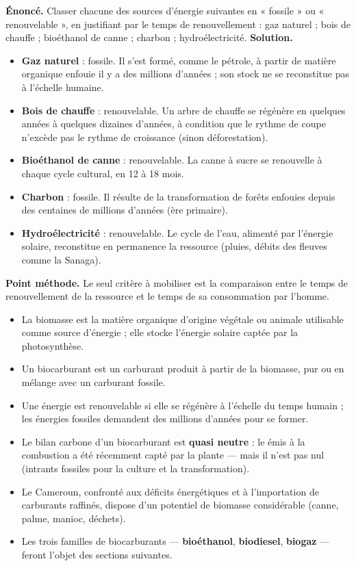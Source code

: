 \documentclass[11pt]{article}
\newcommand{\cle}[1]{{\popxbold\color{popdark}#1}}
\begin{document}
\begin{exoresolu}
\textbf{Énoncé.} Classer chacune des sources d'énergie suivantes en « fossile » ou « renouvelable », en justifiant par le temps de renouvellement : gaz naturel ; bois de chauffe ; bioéthanol de canne ; charbon ; hydroélectricité.
\tcblower
\textbf{Solution.}
\begin{itemize}
\item \textbf{Gaz naturel} : fossile. Il s'est formé, comme le pétrole, à partir de matière organique enfouie il y a des millions d'années ; son stock ne se reconstitue pas à l'échelle humaine.
\item \textbf{Bois de chauffe} : renouvelable. Un arbre de chauffe se régénère en quelques années à quelques dizaines d'années, à condition que le rythme de coupe n'excède pas le rythme de croissance (sinon déforestation).
\item \textbf{Bioéthanol de canne} : renouvelable. La canne à sucre se renouvelle à chaque cycle cultural, en 12 à 18 mois.
\item \textbf{Charbon} : fossile. Il résulte de la transformation de forêts enfouies depuis des centaines de millions d'années (ère primaire).
\item \textbf{Hydroélectricité} : renouvelable. Le cycle de l'eau, alimenté par l'énergie solaire, reconstitue en permanence la ressource (pluies, débits des fleuves comme la Sanaga).
\end{itemize}
\textbf{Point méthode.} Le seul critère à mobiliser est la comparaison entre le temps de renouvellement de la ressource et le temps de sa consommation par l'homme.
\end{exoresolu}

\begin{aretenir}
\begin{itemize}
\item La \cle{biomasse} est la matière organique d'origine végétale ou animale utilisable comme source d'énergie ; elle stocke l'énergie solaire captée par la photosynthèse.
\item Un \cle{biocarburant} est un carburant produit à partir de la biomasse, pur ou en mélange avec un carburant fossile.
\item Une énergie est \cle{renouvelable} si elle se régénère à l'échelle du temps humain ; les énergies \cle{fossiles} demandent des millions d'années pour se former.
\item Le bilan carbone d'un biocarburant est \textbf{quasi neutre} : le  émis à la combustion a été récemment capté par la plante — mais il n'est pas nul (intrants fossiles pour la culture et la transformation).
\item Le Cameroun, confronté aux déficits énergétiques et à l'importation de carburants raffinés, dispose d'un potentiel de biomasse considérable (canne, palme, manioc, déchets).
\item Les trois familles de biocarburants — \textbf{bioéthanol}, \textbf{biodiesel}, \textbf{biogaz} — feront l'objet des sections suivantes.
\end{itemize}
\end{aretenir}
\end{document}

